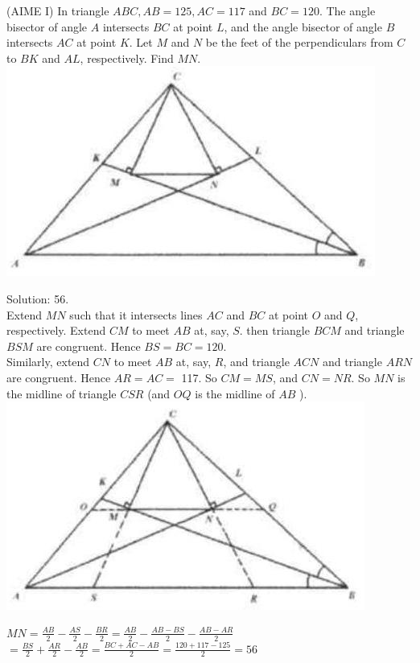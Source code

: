 \documentclass{article}
\begin{document}
(AIME I) In triangle \(A B C, A B=125, A C=117\) and \(B C=120\). The angle bisector of angle \(A\) intersects \(B C\) at point \(L\), and the angle bisector of angle \(B\) intersects \(A C\) at point \(K\). Let \(M\) and \(N\) be the feet of the perpendiculars from \(C\) to \(B K\) and \(A L\), respectively. Find \(M N\).\\
\centering
\includegraphics[width=\textwidth]{images/059(2).jpg}

Solution: 56.\\
Extend \(M N\) such that it intersects lines \(A C\) and \(B C\) at point \(O\) and \(Q\), respectively. Extend \(C M\) to meet \(A B\) at, say, \(S\). then triangle \(B C M\) and triangle \(B S M\) are congruent. Hence \(B S=B C=120\).\\
Similarly, extend \(C N\) to meet \(A B\) at, say, \(R\), and triangle \(A C N\) and triangle \(A R N\) are congruent. Hence \(A R=A C=\) 117. So \(C M=M S\), and \(C N=N R\). So \(M N\) is the midline of triangle \(C S R\) (and \(O Q\) is the midline of \(A B\) ).\\
\centering
\includegraphics[width=\textwidth]{images/059.jpg}

\(M N=\frac{A B}{2}-\frac{A S}{2}-\frac{B R}{2}=\frac{A B}{2}-\frac{A B-B S}{2}-\frac{A B-A R}{2}\)\\
\(=\frac{B S}{2}+\frac{A R}{2}-\frac{A B}{2}=\frac{B C+A C-A B}{2}=\frac{120+117-125}{2}=56\)
\end{document}
